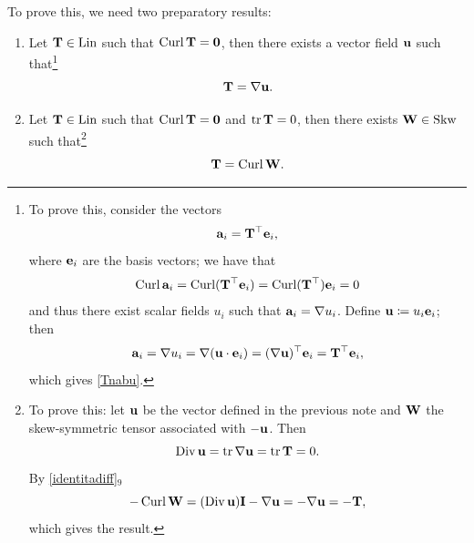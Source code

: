 To prove this, we need two preparatory results:
\begin{enumerate}
	\item Let \(\mathbf{T} \in \operatorname{Lin}\) such that \(\operatorname{Curl} \mathbf{T} = \mathbf{0}\), then there exists a vector field \(\mathbf{u}\) such that\footnote{To prove this, consider the vectors
		\begin{equation}
			\mathbf{a}_i = \mathbf{T}^\top \mathbf{e}_i,
		\end{equation}
		where \(\mathbf{e}_i\) are the basis vectors; we have that
		\begin{equation}
			\operatorname{Curl} \mathbf{a}_i = \operatorname{Curl} (\mathbf{T}^\top \mathbf{e}_i) = \operatorname{Curl}(\mathbf{T}^\top) \mathbf{e}_i = 0
		\end{equation}
		and thus there exist scalar fields \(u_i\) such that \(\mathbf{a}_i = \nabla u_i\).
		Define \(\mathbf{u} \coloneqq u_i \mathbf{e}_i\); then
		\begin{equation}
			\mathbf{a}_i = \nabla u_i = \nabla(\mathbf{u} \cdot \mathbf{e}_i) = (\nabla \mathbf{u})^\top \mathbf{e}_i = \mathbf{T}^\top \mathbf{e}_i,
		\end{equation}
		which gives \eqref{Tnabu}.}
	\begin{equation}\label{Tnabu}
		\mathbf{T} = \nabla \mathbf{u}.
	\end{equation}
	\item Let \(\mathbf{T} \in \operatorname{Lin}\) such that \(\operatorname{Curl} \mathbf{T} = \mathbf{0}\) and \(\operatorname{tr} \mathbf{T} = 0\), then there exists \(\mathbf{W} \in \operatorname{Skw}\) such that\footnote{
		To prove this: let \(\mathbf{u}\) be the vector defined in the previous note and \(\mathbf{W}\) the skew-symmetric tensor associated with \(-\mathbf{u}\). Then
		\begin{equation}
			\operatorname{Div} \mathbf{u} = \operatorname{tr} \nabla \mathbf{u} = \operatorname{tr} \mathbf{T} = 0.
		\end{equation}
		By \eqref{identitadiff}$_9$
		\begin{equation}
			-\operatorname{Curl} \mathbf{W} = (\operatorname{Div} \mathbf{u})\mathbf{I} - \nabla \mathbf{u} = -\nabla \mathbf{u} = -\mathbf{T},
		\end{equation}
		which gives the result.
	}
	\begin{equation}
		\mathbf{T} = \operatorname{Curl} \mathbf{W}.
	\end{equation}
\end{enumerate}

